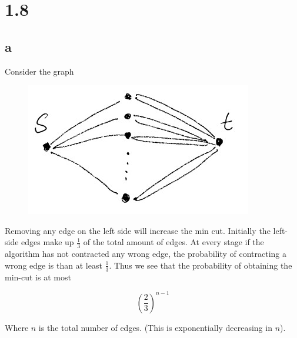 \documentclass{article}
\begin{document}
\section*{1.8}

\subsection*{a}

Consider the graph

\begin{figure}[h]
	\centering
	\includegraphics{graph1.jpg}
\end{figure}

Removing any edge on the left side will increase the min cut. 
Initially the left-side edges make up $\frac{1}{3}$ of the total amount of edges.
At every stage if the algorithm has not contracted any wrong edge, the probability of contracting a wrong edge is than at least $\frac{1}{3}$. Thus we see that the probability of obtaining the min-cut is at most

$$ \left(\frac{2}{3}\right)^{n-1} $$

Where $n$ is the total number of edges. (This is exponentially decreasing in $n$).
\end{document}
